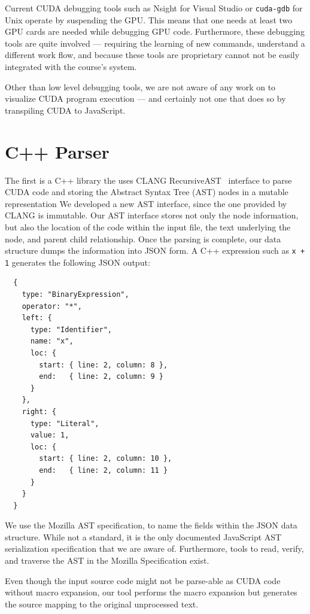 \documentclass[nocopyrightspace]{sigchi}
\begin{document}
Current CUDA debugging tools such as Nsight for Visual Studio or {\tt cuda-gdb}
for Unix operate by suspending the GPU. This means that one needs at least two
GPU cards are needed while debugging GPU code. Furthermore, these debugging tools
are quite involved --- requiring the learning of new commands, understand a
different work flow, and because these tools are proprietary cannot not be easily
integrated with the course's system.


Other than low level debugging tools, we are not aware of any work on 
to visualize CUDA program execution --- and certainly not one that 
does so by transpiling CUDA to JavaScript.



\section{C++ Parser}

The first is a C++ library the uses CLANG RecursiveAST~\cite{lattner2004llvm} interface to parse CUDA code
and storing the Abstract Syntax Tree (AST) nodes in a mutable representation
We developed a new AST interface, since the one provided by CLANG is immutable.
Our AST interface stores not only the node information, but also the location
of the code within the input file, the text underlying the node, and parent child
relationship. Once the parsing is complete, our data structure dumps the information
into JSON form. A C++ expression such as {\tt x + 1} generates the following JSON
output:

\begin{verbatim}
  {
    type: "BinaryExpression",
    operator: "*",
    left: {
      type: "Identifier",
      name: "x",
      loc: {
        start: { line: 2, column: 8 },
        end:   { line: 2, column: 9 }
      }
    },
    right: {
      type: "Literal",
      value: 1,
      loc: {
        start: { line: 2, column: 10 },
        end:   { line: 2, column: 11 }
      }
    }
  }
\end{verbatim}

We use the Mozilla AST specification, to name the fields within the JSON data structure.
While not a standard, it is the only documented JavaScript AST serialization specification
that we are aware of. Furthermore, tools to read, verify, and traverse the AST in the
Mozilla Specification exist.

Even though the input source code might not be parse-able as CUDA code without macro expansion,
our tool performs the macro expansion but generates the source mapping to the original 
unprocessed text.
\end{document}
